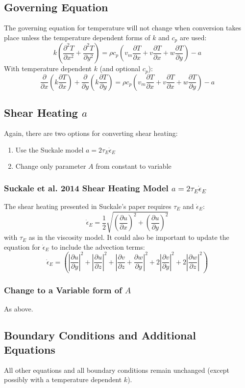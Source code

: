\documentclass[10pt, letterpaper, twoside]{article}
\newcommand{\pd}[2]{\frac{\partial#1}{\partial#2}}
\begin{document}
	\subsection{Governing Equation}
	The governing equation for temperature will not change when conversion takes place unless the temperature dependent forms of $ k $ and $ c_p $ are used:
	\begin{equation*}
		k\left(\pd{^2T}{x^2} + \pd{^2T}{y^2}\right) = \rho c_p\left(v_m\pd{T}{x}+v\pd{T}{x}+w\pd{T}{y}\right) - a
	\end{equation*}
	With temperature dependent $ k $ (and optional $ c_p $):
	\begin{equation*}
		\pd{}{x}\left(k\pd{T}{x}\right) + \pd{}{y}\left(k\pd{T}{y}\right) = \rho c_p\left(v_m\pd{T}{x}+v\pd{T}{x}+w\pd{T}{y}\right) - a
	\end{equation*}
	\subsection{Shear Heating $ a $}
	Again, there are two options for converting shear heating:
	\begin{enumerate}
		\item Use the Suckale model $ a = 2\tau_{\scriptscriptstyle E}\dot{\epsilon}_{\scriptscriptstyle E} $
		\item Change only parameter $ A $ from constant to variable
	\end{enumerate}
	\subsubsection{Suckale et al. 2014 Shear Heating Model $ a = 2\tau_{\scriptscriptstyle E}\dot{\epsilon}_{\scriptscriptstyle E} $}
	The shear heating presented in Suckale's paper requires $ \tau_{\scriptscriptstyle E} $ and $ \dot{\epsilon}_{\scriptscriptstyle E} $:
	\begin{equation}
		\dot{\epsilon}_{\scriptscriptstyle E} =\frac{1}{2}\sqrt{\left(\pd{u}{x}\right)^2 + \left(\pd{u}{y}\right)^2}
	\end{equation}
	with $ \tau_{\scriptscriptstyle E} $ as in the viscosity model.
	It could also be important to update the equation for $ \dot{\epsilon}_{\scriptscriptstyle E} $ to include the advection terms:
	\begin{equation*}
		\dot{\epsilon}_{\scriptscriptstyle E} = \left(\left|\pd{u}{y}\right|^2 + \left|\pd{u}{z}\right|^2 + \left|\pd{v}{z} + \pd{w}{y}\right|^2 + 2\left|\pd{v}{y}\right|^2 + 2\left|\pd{w}{z}\right|^2\right)
	\end{equation*}
	\subsubsection{Change to a Variable form of $ A $}
	As above.
	\subsection{Boundary Conditions and Additional Equations}
	All other equations and all boundary conditions remain unchanged (except possibly with a temperature dependent $ k $).
	
\end{document}
